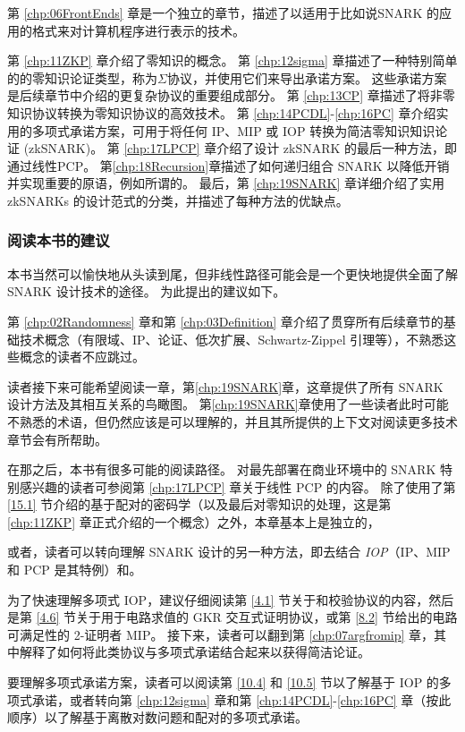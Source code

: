 第 \ref{chp:06FrontEnds} 章是一个独立的章节，描述了以适用于比如说SNARK 的应用的格式来对计算机程序进行表示的技术。

第 \ref{chp:11ZKP} 章介绍了零知识的概念。 第 \ref{chp:12sigma} 章描述了一种特别简单的的零知识论证类型，称为$\Sigma$协议，并使用它们来导出承诺方案。 这些承诺方案是后续章节中介绍的更复杂协议的重要组成部分。 第 \ref{chp:13CP} 章描述了将非零知识协议转换为零知识协议的高效技术。 第 \ref{chp:14PCDL}-\ref{chp:16PC} 章介绍实用的多项式承诺方案，可用于将任何 IP、MIP 或 IOP 转换为简洁零知识知识论证 (zkSNARK)。 第 \ref{chp:17LPCP} 章介绍了设计 zkSNARK 的最后一种方法，即通过线性PCP。 第\ref{chp:18Recursion}章描述了如何递归组合 SNARK 以降低开销并实现重要的原语，例如所谓的。 最后，第 \ref{chp:19SNARK} 章详细介绍了实用 zkSNARKs 的设计范式的分类，并描述了每种方法的优缺点。


\subsubsection{阅读本书的建议} 本书当然可以愉快地从头读到尾，但非线性路径可能会是一个更快地提供全面了解 SNARK 设计技术的途径。 为此提出的建议如下。

第 \ref{chp:02Randomness} 章和第 \ref{chp:03Definition} 章介绍了贯穿所有后续章节的基础技术概念（有限域、IP、论证、低次扩展、Schwartz-Zippel 引理等），不熟悉这些概念的读者不应跳过。

读者接下来可能希望阅读一章，第\ref{chp:19SNARK}章，这章提供了所有 SNARK 设计方法及其相互关系的鸟瞰图。 第\ref{chp:19SNARK}章使用了一些读者此时可能不熟悉的术语，但仍然应该是可以理解的，并且其所提供的上下文对阅读更多技术章节会有所帮助。

在那之后，本书有很多可能的阅读路径。 对最先部署在商业环境中的 SNARK 特别感兴趣的读者可参阅第 \ref{chp:17LPCP} 章关于线性 PCP 的内容。 除了使用了第 \ref{15.1} 节介绍的基于配对的密码学（以及最后对零知识的处理，这是第 \ref{chp:11ZKP} 章正式介绍的一个概念）之外，本章基本上是独立的，

或者，读者可以转向理解 SNARK 设计的另一种方法，即去结合 \emph{IOP}（IP、MIP 和 PCP 是其特例）和。

为了快速理解多项式 IOP，建议仔细阅读第 \ref{4.1} 节关于和校验协议的内容，然后是第 \ref{4.6} 节关于用于电路求值的 GKR 交互式证明协议，或第 \ref{8.2} 节给出的电路可满足性的 2-证明者 MIP。 
接下来，读者可以翻到第 \ref{chp:07argfromip} 章，其中解释了如何将此类协议与多项式承诺结合起来以获得简洁论证。

要理解多项式承诺方案，读者可以阅读第 \ref{10.4} 和 \ref{10.5} 节以了解基于 IOP 的多项式承诺，或者转向第 \ref{chp:12sigma} 章和第 \ref{chp:14PCDL}-\ref{chp:16PC} 章（按此顺序）以了解基于离散对数问题和配对的多项式承诺。

